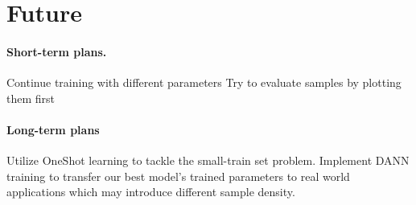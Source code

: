 \section{Future}

\paragraph{Short-term plans.}
Continue training with different parameters
Try to evaluate samples by plotting them first

\paragraph{Long-term plans}
Utilize OneShot learning to tackle the small-train set problem.
Implement DANN training to transfer our best model's trained parameters to real world applications which may introduce different sample density.
